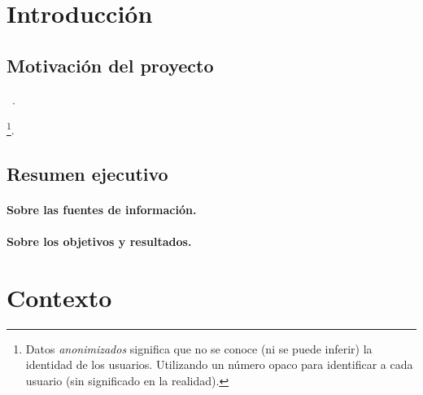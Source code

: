 
\chapter{Introducción}
\label{chap:intro}

\section{Motivación del proyecto}
\label{sec:resumen}

\lipsum[1-1]~\cite{Karabati2009, Letham:2016}. %

\begin{remark}\textbf{\lipsum[1-1]}\end{remark} 

\lipsum[1-1] \footnote{Datos \emph{anonimizados} significa que no se conoce (ni se puede inferir) la identidad de los usuarios. Utilizando un número opaco para identificar a cada usuario (sin significado en la realidad).}.

\lipsum[1-1] %


\section{Resumen ejecutivo}
\label{sec:ejecutivo}

\subsubsection{Sobre las fuentes de información.}
\lipsum[1-2] %

\subsubsection{Sobre los objetivos y resultados.}

\lipsum[1-3] %






\chapter{Contexto}
\label{chap:contexto}

